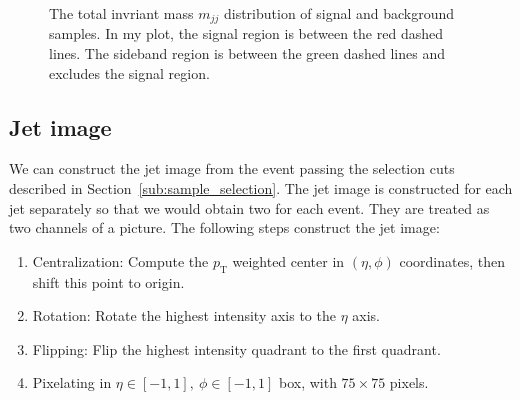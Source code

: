 \documentclass[12pt]{article}
\begin{document}
        \begin{figure}[htpb]
            \centering
            
            \caption{The total invriant mass $m_{jj}$ distribution of signal and background samples. In my plot, the signal region is between the red dashed lines. The sideband region is between the green dashed lines and excludes the signal region.}
            \label{fig:HVmodel_mjj_distribution}
        \end{figure}
    \subsection{Jet image}%
    \label{sub:jet_image}
        We can construct the jet image from the event passing the selection cuts described in Section~\ref{sub:sample_selection}. The jet image is constructed for each jet separately so that we would obtain two for each event. They are treated as two channels of a picture. The following steps construct the jet image:
        \begin{enumerate}
            \item Centralization: Compute the $p_{\text{T}}$ weighted center in $\left( \eta,\phi \right) $ coordinates, then shift this point to origin.
            \item Rotation: Rotate the highest intensity axis to the $\eta$ axis.
            \item Flipping: Flip the highest intensity quadrant to the first quadrant.
            \item Pixelating in $\eta \in [-1,1],\ \phi \in [-1,1]$ box, with $75\times 75$ pixels.
        \end{enumerate}
\end{document}
